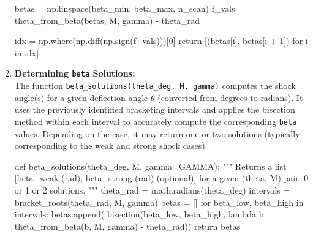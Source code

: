 \begin{enumerate}[label=- , leftmargin=*, itemsep=1em]
\begin{pycode}
	betas = np.linspace(beta_min, beta_max, n_scan)
	f_vals = theta_from_beta(betas, M, gamma) - theta_rad

	idx = np.where(np.diff(np.sign(f_vals)))[0]
	return [(betas[i], betas[i + 1]) for i in idx]
	\end{pycode}


	\item \textbf{Determining \texttt{beta} Solutions:} \\
	The function \texttt{beta\_solutions(theta\_deg, M, gamma)} computes the shock angle(s) for a given deflection angle \(\theta\) (converted from degrees to radians). It uses the previously identified bracketing intervals and applies the bisection method within each interval to accurately compute the corresponding \texttt{beta} values. Depending on the case, it may return one or two solutions (typically corresponding to the weak and strong shock cases).
	\begin{pycode}
def beta_solutions(theta_deg, M, gamma=GAMMA):
	"""
	Returns a list [beta_weak (rad), beta_strong (rad) (optional)]
	for a given (theta, M) pair. 0 or 1 or 2 solutions.
	"""
	theta_rad = math.radians(theta_deg)
	intervals = bracket_roots(theta_rad, M, gamma)
	betas = []
	for beta_low, beta_high in intervals:
		betas.append(
			bisection(beta_low, beta_high,
				lambda b: theta_from_beta(b, M, gamma) 
				- theta_rad))
	return betas
	\end{pycode}
\end{enumerate}

